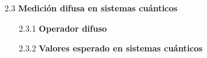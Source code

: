 \documentclass[12pt,oneside]{book}\raggedbottom{} %
\begin{document}
\begin{sloppypar}
{{\begin{itemize}

  \item[2.3]\textbf{{Medición difusa en sistemas cuánticos}}  



\begin{itemize}
  \item[2.3.1]\textbf{{Operador difuso}}
  




  \item[2.3.2] \textbf{Valores esperado en sistemas cuánticos} 
  
  

\end{itemize}
\end{itemize}}}
\end{sloppypar}
\end{document}
